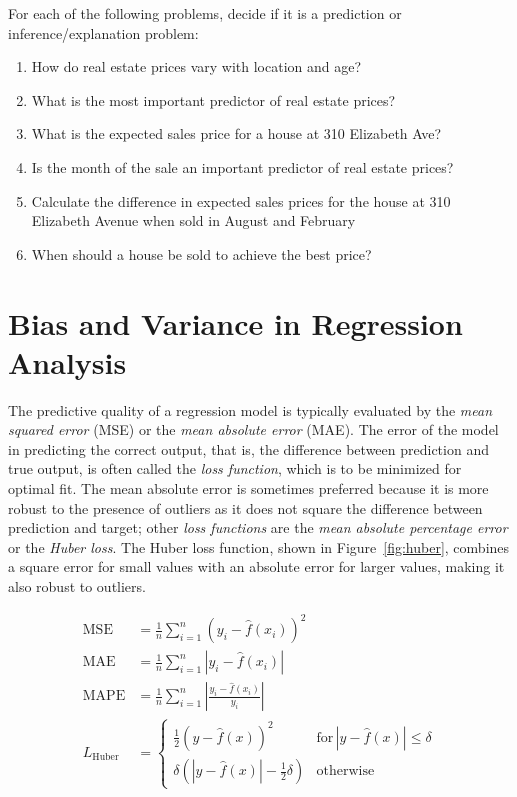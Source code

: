 \begin{exercisebox}
For each of the following problems, decide if it is a prediction or inference/explanation problem:
\begin{enumerate}
   \item How do real estate prices vary with location and age?
   \item What is the most important predictor of real estate prices?
   \item What is the expected sales price for a house at 310 Elizabeth Ave?
   \item Is the month of the sale an important predictor of real estate prices?
   \item Calculate the difference in expected sales prices for the house at 310 Elizabeth Avenue when sold in August and February
   \item When should a house be sold to achieve the best price?
\end{enumerate}
\end{exercisebox}

\section{Bias and Variance in Regression Analysis}

The predictive quality of a regression model is typically evaluated by the \emph{mean squared error} (MSE) or the \emph{mean absolute error} (MAE). The error of the model in predicting the correct output, that is, the difference between prediction and true output, is often called the \emph{loss function}, which is to be minimized for optimal fit. The mean absolute error is sometimes preferred because it is more robust to the presence of outliers as it does not square the difference between prediction and target; other \emph{loss functions} are the \emph{mean absolute percentage error} or the \emph{Huber loss}. The Huber loss function, shown in Figure~\ref{fig:huber}, combines a square error for small values with an absolute error for larger values, making it also robust to outliers. 

\begin{align*}
\operatorname{MSE} &= \frac{1}{n}\sum_{i=1}^n (y_i - \hat{f}(x_i))^2 \\
\operatorname{MAE} &= \frac{1}{n}\sum_{i=1}^n |y_i - \hat{f}(x_i)| \\
\operatorname{MAPE} &= \frac{1}{n}\sum_{i=1}^n | \frac{y_i - \hat{f}(x_i)}{y_i}| \\
L_{\text{Huber}} &= \begin{cases} \frac{1}{2}(y - \hat{f}(x))^2 & \text{for}\, |y-\hat{f}(x)| \leq \delta \\
\delta (|y - \hat{f}(x)| - \frac{1}{2}\delta) & \text{otherwise} \end{cases}
\end{align*}

